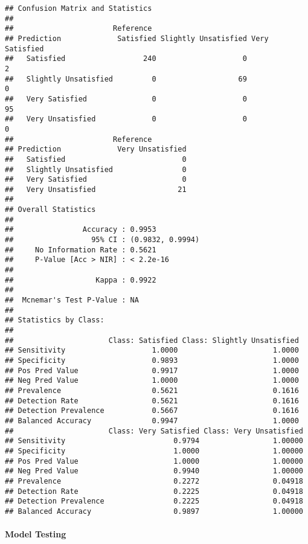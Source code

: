 \documentclass[
]{article}
\begin{document}
\begin{verbatim}
## Confusion Matrix and Statistics
## 
##                       Reference
## Prediction             Satisfied Slightly Unsatisfied Very Satisfied
##   Satisfied                  240                    0              2
##   Slightly Unsatisfied         0                   69              0
##   Very Satisfied               0                    0             95
##   Very Unsatisfied             0                    0              0
##                       Reference
## Prediction             Very Unsatisfied
##   Satisfied                           0
##   Slightly Unsatisfied                0
##   Very Satisfied                      0
##   Very Unsatisfied                   21
## 
## Overall Statistics
##                                           
##                Accuracy : 0.9953          
##                  95% CI : (0.9832, 0.9994)
##     No Information Rate : 0.5621          
##     P-Value [Acc > NIR] : < 2.2e-16       
##                                           
##                   Kappa : 0.9922          
##                                           
##  Mcnemar's Test P-Value : NA              
## 
## Statistics by Class:
## 
##                      Class: Satisfied Class: Slightly Unsatisfied
## Sensitivity                    1.0000                      1.0000
## Specificity                    0.9893                      1.0000
## Pos Pred Value                 0.9917                      1.0000
## Neg Pred Value                 1.0000                      1.0000
## Prevalence                     0.5621                      0.1616
## Detection Rate                 0.5621                      0.1616
## Detection Prevalence           0.5667                      0.1616
## Balanced Accuracy              0.9947                      1.0000
##                      Class: Very Satisfied Class: Very Unsatisfied
## Sensitivity                         0.9794                 1.00000
## Specificity                         1.0000                 1.00000
## Pos Pred Value                      1.0000                 1.00000
## Neg Pred Value                      0.9940                 1.00000
## Prevalence                          0.2272                 0.04918
## Detection Rate                      0.2225                 0.04918
## Detection Prevalence                0.2225                 0.04918
## Balanced Accuracy                   0.9897                 1.00000
\end{verbatim}

\hypertarget{model-testing}{%
\paragraph{Model Testing}\label{model-testing}}
\end{document}
